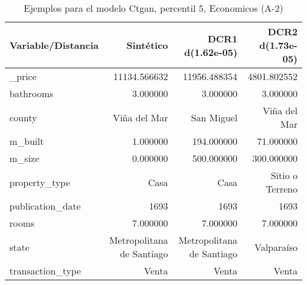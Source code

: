 \begin{table}[H]
\centering
\fontsize{10}{14}\selectfont
\caption{Ejemplos para el modelo Ctgan, percentil 5, Economicos (A-2)}
\label{table-example-economicos-a-2-ctgan-5p}
\begin{tabular}{|l|r|r|r|}
\hline
\rowcolor[gray]{0.8}
Variable/Distancia & Sintético & DCR1 d(1.62e-05) & DCR2 d(1.73e-05) \\
\hline \_price & \cellcolor[rgb]{0.9, 0.54, 0.52} 11134.566632 & 11956.488354 & 4801.802552 \\
\hline bathrooms & \cellcolor[rgb]{0.9, 0.54, 0.52} 3.000000 & \cellcolor[rgb]{0.9, 0.54, 0.52} 3.000000 & \cellcolor[rgb]{0.9, 0.54, 0.52} 3.000000 \\
\hline county & \cellcolor[rgb]{0.9, 0.54, 0.52} Viña del Mar & San Miguel & \cellcolor[rgb]{0.9, 0.54, 0.52} Viña del Mar \\
\hline m\_built & \cellcolor[rgb]{0.9, 0.54, 0.52} 1.000000 & 194.000000 & 71.000000 \\
\hline m\_size & \cellcolor[rgb]{0.9, 0.54, 0.52} 0.000000 & 500.000000 & 300.000000 \\
\hline property\_type & \cellcolor[rgb]{0.9, 0.54, 0.52} Casa & \cellcolor[rgb]{0.9, 0.54, 0.52} Casa & Sitio o Terreno \\
\hline publication\_date & \cellcolor[rgb]{0.9, 0.54, 0.52} 1693 & \cellcolor[rgb]{0.9, 0.54, 0.52} 1693 & \cellcolor[rgb]{0.9, 0.54, 0.52} 1693 \\
\hline rooms & \cellcolor[rgb]{0.9, 0.54, 0.52} 7.000000 & \cellcolor[rgb]{0.9, 0.54, 0.52} 7.000000 & \cellcolor[rgb]{0.9, 0.54, 0.52} 7.000000 \\
\hline state & \cellcolor[rgb]{0.9, 0.54, 0.52} Metropolitana de Santiago & \cellcolor[rgb]{0.9, 0.54, 0.52} Metropolitana de Santiago & Valparaíso \\
\hline transaction\_type & \cellcolor[rgb]{0.9, 0.54, 0.52} Venta & \cellcolor[rgb]{0.9, 0.54, 0.52} Venta & \cellcolor[rgb]{0.9, 0.54, 0.52} Venta \\
\hline
\end{tabular}
\end{table}
